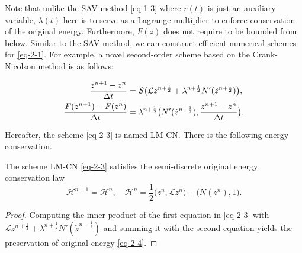 \documentclass[onefignum,onetabnum]{siamart}
\begin{document}
Note that unlike the SAV method \eqref{eq-1-3} where $r(t)$ is just an auxiliary variable, $\lambda(t)$ here is to serve as a Lagrange multiplier to enforce conservation of the original energy. Furthermore, $F(z)$ does not require to be bounded from below. Similar to the SAV method, we can construct efficient numerical schemes for \eqref{eq-2-1}. For example, a novel second-order scheme based on the Crank-Nicolson method is as follows:
\begin{algorithm}[H]
\begin{align}\label{eq-2-3}
	\aligned
	\frac{z^{n+1}-z^n}{\Delta t}&=\mathcal{S}\big(\mathcal{L}z^{n+\frac{1}{2}}+\lambda^{n+\frac{1}{2}}N'(\tilde{z}^{n+\frac{1}{2}})\big),\\
	\frac{F(z^{n+1})-F(z^n)}{\Delta t}&=\lambda^{n+\frac{1}{2}}\big(N'(\tilde{z}^{n+\frac{1}{2}}),\frac{z^{n+1}-z^n}{\Delta t}\big).
	\endaligned
\end{align}
\end{algorithm}
\noindent Hereafter, the scheme \eqref{eq-2-3} is named LM-CN. There is the following energy conservation.
\begin{theorem}\label{Th-2-2}
The scheme LM-CN \eqref{eq-2-3} satisfies the semi-discrete original energy conservation law
\begin{equation}\label{eq-2-4}
	\mathcal{H}^{n+1}=\mathcal{H}^n,\quad  \mathcal{H}^n=\frac{1}{2}\big(z^n,\mathcal{L}z^n\big)+\big(N(z^n),1\big).
\end{equation} 
\end{theorem}
\begin{proof}
Computing the inner product of the first equation in \eqref{eq-2-3} with $\mathcal{L}z^{n+\frac{1}{2}}+\lambda^{n+\frac{1}{2}}N'(\tilde{z}^{n+\frac{1}{2}})$ and summing it with the second equation yields the preservation of original energy \eqref{eq-2-4}.
\end{proof}
\end{document}

